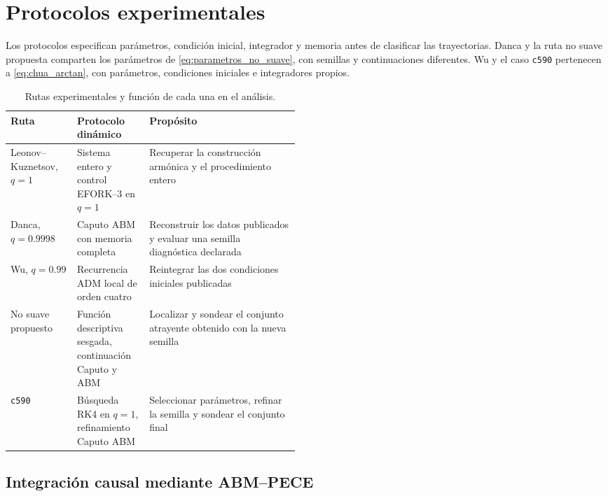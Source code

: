 \section{Protocolos experimentales}
\label{sec:protocolos}

\HAFOCardProtocols

Los protocolos especifican parámetros, condición inicial, integrador y
memoria antes de clasificar las trayectorias. Danca y la ruta no suave
propuesta comparten los parámetros de \cref{eq:parametros_no_suave}, con
semillas y continuaciones diferentes. Wu y el caso \texttt{c590} pertenecen a
\cref{eq:chua_arctan}, con parámetros, condiciones iniciales e integradores
propios.

\begin{table}[H]
\centering
\caption{Rutas experimentales y función de cada una en el análisis.}
\label{tab:carriles_experimentales}
\begin{tabularx}{\linewidth}{L{0.23\linewidth}L{0.25\linewidth}Y}
\toprule
Ruta & Protocolo dinámico & Propósito\\
\midrule
Leonov--Kuznetsov, \(q=1\)
& Sistema entero y control EFORK--3 en \(q=1\)
& Recuperar la construcción armónica y el procedimiento entero\\
Danca, \(q=0.9998\)
& Caputo ABM con memoria completa
& Reconstruir los datos publicados y evaluar una semilla diagnóstica
declarada\\
Wu, \(q=0.99\)
& Recurrencia ADM local de orden cuatro
& Reintegrar las dos condiciones iniciales publicadas\\
No suave propuesto
& Función descriptiva sesgada, continuación Caputo y ABM
& Localizar y sondear el conjunto atrayente obtenido con la nueva semilla\\
\texttt{c590}
& Búsqueda RK4 en \(q=1\), refinamiento Caputo ABM
& Seleccionar parámetros, refinar la semilla y sondear el conjunto final\\
\bottomrule
\end{tabularx}
\end{table}

\subsection{Integración causal mediante ABM--PECE}
\label{subsec:protocolo_abm}

